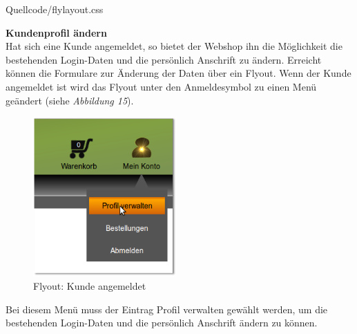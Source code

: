\begin{center}
	\begin{lstinputlisting}[language=CSS, caption={Loginbereich: Umsetzung des Flyouts mit CSS 2.0}]
		{Quellcode/flylayout.css}
	\end{lstinputlisting}
\end{center}

\textbf{Kundenprofil ändern}\\
Hat sich eine Kunde angemeldet, so bietet der Webshop ihn die Möglichkeit die bestehenden Login-Daten und die persönlich Anschrift zu ändern. Erreicht können die Formulare zur Änderung der Daten über ein Flyout. Wenn der Kunde angemeldet ist wird das Flyout unter den Anmeldesymbol zu einen Menü geändert (siehe \textit{Abbildung 15}).
\begin{figure}[H]
	\begin{center}
			\includegraphics[width=55mm]{Bilder/Abbildung15_Menue_Profil_aendern.png}
	\end{center}
	\caption{Flyout: Kunde angemeldet}
	\label{fig:Abbildung 15}
\end{figure}

Bei diesem Menü muss der Eintrag \glqq Profil verwalten\grqq{} gewählt werden, um die bestehenden Login-Daten und die persönlich Anschrift ändern zu können.
